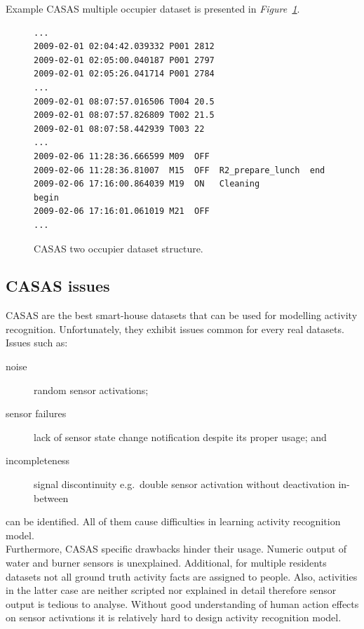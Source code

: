 \documentclass[10pt, a4paper, pdflatex, leqno, twoside, openright]{report}
\begin{document}
Example CASAS multiple occupier dataset is presented in \emph{Figure~\ref{lst:CASAStwoR}}.
\begin{figure}[htb]
  \begin{lstlisting}
...
2009-02-01 02:04:42.039332 P001 2812
2009-02-01 02:05:00.040187 P001 2797
2009-02-01 02:05:26.041714 P001 2784
...
2009-02-01 08:07:57.016506 T004 20.5
2009-02-01 08:07:57.826809 T002 21.5
2009-02-01 08:07:58.442939 T003 22
...
2009-02-06 11:28:36.666599 M09  OFF
2009-02-06 11:28:36.81007  M15  OFF  R2_prepare_lunch  end
2009-02-06 17:16:00.864039 M19  ON   Cleaning          begin
2009-02-06 17:16:01.061019 M21  OFF
...
  \end{lstlisting}
  \caption{CASAS two occupier dataset structure.\label{lst:CASAStwoR}}
\end{figure}

    \subsection{CASAS issues\label{sec:dataIssues}}
CASAS are the best smart-house datasets that can be used for modelling activity recognition. Unfortunately, they exhibit issues common for every real datasets. Issues such as:
\begin{description}
\item[noise] random sensor activations;
\item[sensor failures] lack of sensor state change notification despite its proper usage; and
\item[incompleteness] signal discontinuity e.g.\ double sensor activation without deactivation in-between
\end{description}
can be identified. All of them cause difficulties in learning activity recognition model.\\

Furthermore, CASAS specific drawbacks hinder their usage. Numeric output of water and burner sensors is unexplained. Additional, for multiple residents datasets not all ground truth activity facts are assigned to people. Also, activities in the latter case are neither scripted nor explained in detail therefore sensor output is tedious to analyse. Without good understanding of human action effects on sensor activations it is relatively hard to design activity recognition model.\\
\end{document}
